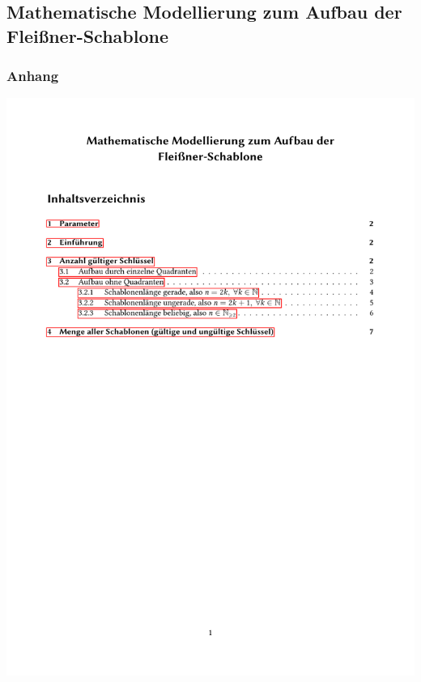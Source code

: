 \documentclass{beamer}
\begin{document}
\subsection{Mathematische Modellierung zum Aufbau der Fleißner-Schablone}
\begin{frame}
\frametitle{Anhang}
\includegraphics[page=1, scale=0.4]{mathModell.pdf}
\end{frame}
\end{document}
